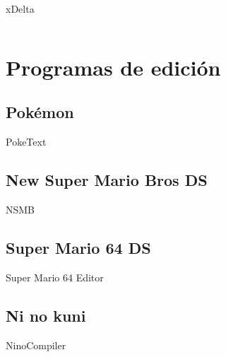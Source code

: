 \begin{frame}{xDelta}
\begin{columns}
\begin{column}{0.3\textwidth}
        \vfill
    \end{column}
    \end{columns}
\end{frame}

\section{Programas de edición}
\subsection{Pokémon}
\begin{frame}{PokeText}
\end{frame}

\subsection{New Super Mario Bros DS}
\begin{frame}{NSMB}
\end{frame}

\subsection{Super Mario 64 DS}
\begin{frame}{Super Mario 64 Editor}
\end{frame}

\subsection{Ni no kuni}
\begin{frame}{NinoCompiler}
\end{frame}
